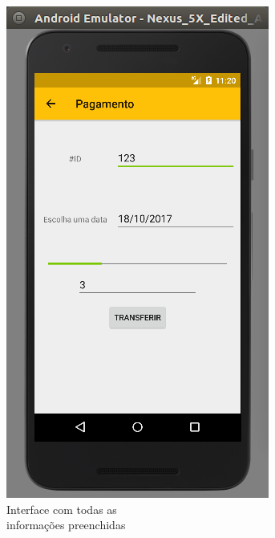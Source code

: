 \documentclass[hidelinks,12pt]{article}
\begin{document}
\begin{figure}[H]
	\begin{subfigure}{0.5\textwidth}
		\includegraphics[scale=0.5]{int:pay}
		\caption{Interface com todas as\\\hspace{\textwidth}informa\c{c}\~oes preenchidas}
		\label{int:pay_img}
	\end{subfigure}
	\begin{subfigure}{0.5\textwidth}

\end{subfigure}
\end{figure}
\end{document}
